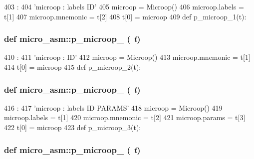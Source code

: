 \begin{DoxyCode}
403                   :
404     'microop : labels ID'
405     microop = Microop()
406     microop.labels = t[1]
407     microop.mnemonic = t[2]
408     t[0] = microop
409 
def p_microop_1(t):
\end{DoxyCode}
\hypertarget{namespacemicro__asm_aabbc3564c9f11e69915460e13e307b07}{
\subsubsection[{p\_\-microop\_\-1}]{\setlength{\rightskip}{0pt plus 5cm}def micro\_\-asm::p\_\-microop\_ ( {\em t})}}
\label{namespacemicro__asm_aabbc3564c9f11e69915460e13e307b07}



\begin{DoxyCode}
410                   :
411     'microop : ID'
412     microop = Microop()
413     microop.mnemonic = t[1]
414     t[0] = microop
415 
def p_microop_2(t):
\end{DoxyCode}
\hypertarget{namespacemicro__asm_a3bf613ee79e6c58586b467556274fc84}{
\subsubsection[{p\_\-microop\_\-2}]{\setlength{\rightskip}{0pt plus 5cm}def micro\_\-asm::p\_\-microop\_ ( {\em t})}}
\label{namespacemicro__asm_a3bf613ee79e6c58586b467556274fc84}



\begin{DoxyCode}
416                   :
417     'microop : labels ID PARAMS'
418     microop = Microop()
419     microop.labels = t[1]
420     microop.mnemonic = t[2]
421     microop.params = t[3]
422     t[0] = microop
423 
def p_microop_3(t):
\end{DoxyCode}
\hypertarget{namespacemicro__asm_a86065607f7f81cdbb6bbf1375e32c2c2}{
\subsubsection[{p\_\-microop\_\-3}]{\setlength{\rightskip}{0pt plus 5cm}def micro\_\-asm::p\_\-microop\_ ( {\em t})}}
\label{namespacemicro__asm_a86065607f7f81cdbb6bbf1375e32c2c2}




